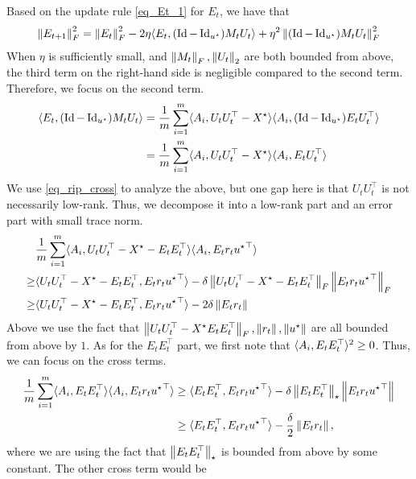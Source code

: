 Based on the update rule \eqref{eq_Et_1} for $E_t$, we have that
\[ \left\| E_{t+1} \right\|_{F}^2 = \left\| E_t \right\|_{F}^2 - 2\eta \langle E_t, (\operatorname{Id} - \operatorname{Id}_{u^{\star}}) M_t U_t \rangle + \eta^2 \left\| (\operatorname{Id} - \operatorname{Id}_{u^{\star}}) M_t U_t  \right\|_{F}^2 \]
When $\eta$ is sufficiently small, and $\left\| M_t \right\|_{F}, \left\| U_t \right\|_{2}$ are both bounded from above, the third term on the right-hand side is negligible compared to the second term.
Therefore, we focus on the second term.
\begin{align*}
    \langle E_t, (\operatorname{Id} - \operatorname{Id}_{u^{\star}}) M_t U_t \rangle 
    &= \frac 1 m \sum_{i=1}^m \langle A_i, U_t U_t^{\top} - X^{\star} \rangle \langle A_i, (\operatorname{Id} - \operatorname{Id}_{u^{\star}}) E_t U_t^{\top} \rangle \\
    &= \frac 1 m \sum_{i=1}^m \langle A_i, U_t U_t^{\top} - X^{\star} \rangle \langle A_i, E_t U_t^{\top} \rangle
\end{align*}
We use \eqref{eq_rip_cross} to analyze the above, but one gap here is that $U_t U_t^{\top}$ is not necessarily low-rank.
Thus, we decompose it into a low-rank part and an error part with small trace norm.
\begin{align}
    & \frac 1 m \sum_{i=1}^m \langle A_i, U_t U_t^{\top} - X^{\star} - E_t E_t^{\top} \rangle \langle A_i, E_t r_t {u^{\star}}^{\top} \rangle \\
    \ge & \langle U_t U_t^{\top} - X^{\star} - E_t E_t^{\top}, E_t r_t {u^{\star}}^{\top}  \rangle - \delta \left\| U_t U_t^{\top} - X^{\star} - E_t E_t^{\top} \right\|_{F} \left\| E_t r_t {u^{\star}}^{\top} \right\|_{F} \\
    \ge & \langle U_t U_t^{\top} - X^{\star} - E_t E_t^{\top}, E_t r_t {u^{\star}}^{\top} \rangle - 2\delta \left\| E_t r_t \right\|
\end{align}
Above we use the fact that $\left\| U_t U_t^{\top} - X^{\star} E_t E_t^{\top} \right\|_{F}, \left\| r_t \right\|, \left\| u^{\star} \right\|$ are all bounded from above by $1$.
As for the $E_t E_t^{\top}$ part, we first note that $\langle A_i, E_t E_t^{\top} \rangle^2 \ge 0$.
Thus, we can focus on the cross terms.
\begin{align*}
    \frac 1 m \sum_{i=1}^m \langle A_i, E_t E_t^{\top} \rangle \langle A_i, E_t r_t {u^{\star}}^{\top} \rangle
    &\ge \langle E_t E_t^{\top}, E_t r_t {u^{\star}}^{\top} \rangle - \delta \left\| E_t E_t^{\top} \right\|_{\star} \left\| E_t r_t {u^{\star}}^{\top} \right\| \\
    &\ge \langle E_t E_t^{\top}, E_t r_t {u^{\star}}^{\top} \rangle - \frac {\delta} 2 \left\| E_t r_t \right\|,
\end{align*}
where we are using the fact that $\left\| E_t E_t^{\top} \right\|_{\star}$ is bounded from above by some constant.
The other cross term would be
